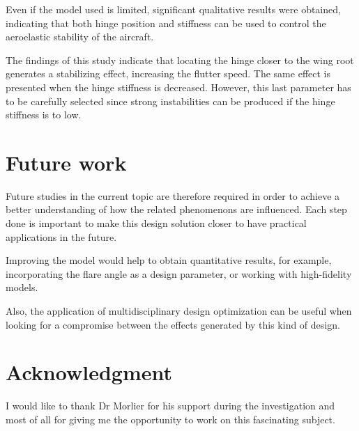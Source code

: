\documentclass[conference]{IEEEtran}
\begin{document}
Even if the model used is limited, significant qualitative results were obtained, indicating that both hinge position and stiffness can be used to control the aeroelastic stability of the aircraft.

The findings of this study indicate that locating the hinge closer to the wing root generates a stabilizing effect, increasing the flutter speed. The same effect is presented when the hinge stiffness is decreased. However, this last parameter has to be carefully selected since strong instabilities can be produced if the hinge stiffness is to low.


\section{Future work}
Future studies in the current topic are therefore required in order to achieve a better understanding of how the related phenomenons are influenced. Each step done is important to make this design solution closer to have practical applications in the future.

Improving the model would help to obtain quantitative results, for example, incorporating the flare angle as a design parameter, or working with high-fidelity models.

Also, the application of multidisciplinary design optimization can be useful when looking for a compromise between the effects generated by this kind of design.



\section*{Acknowledgment}
I would like to thank Dr Morlier for his support during the investigation and most of all for giving me the opportunity to work on this fascinating subject.



\end{document}
